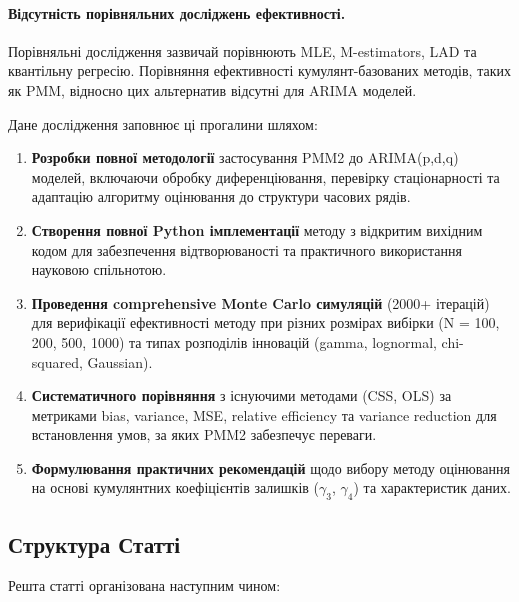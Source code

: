 \documentclass[12pt,a4paper]{article}
\begin{document}
\paragraph{Відсутність порівняльних досліджень ефективності.} Порівняльні дослідження зазвичай порівнюють MLE, M-estimators, LAD та квантільну регресію. Порівняння ефективності кумулянт-базованих методів, таких як PMM, відносно цих альтернатив відсутні для ARIMA моделей.

Дане дослідження заповнює ці прогалини шляхом:

\begin{enumerate}
    \item \textbf{Розробки повної методології} застосування PMM2 до ARIMA(p,d,q) моделей, включаючи обробку диференціювання, перевірку стаціонарності та адаптацію алгоритму оцінювання до структури часових рядів.

    \item \textbf{Створення повної Python імплементації} методу з відкритим вихідним кодом для забезпечення відтворюваності та практичного використання науковою спільнотою.

    \item \textbf{Проведення comprehensive Monte Carlo симуляцій} (2000+ ітерацій) для верифікації ефективності методу при різних розмірах вибірки (N = 100, 200, 500, 1000) та типах розподілів інновацій (gamma, lognormal, chi-squared, Gaussian).

    \item \textbf{Систематичного порівняння} з існуючими методами (CSS, OLS) за метриками bias, variance, MSE, relative efficiency та variance reduction для встановлення умов, за яких PMM2 забезпечує переваги.

    \item \textbf{Формулювання практичних рекомендацій} щодо вибору методу оцінювання на основі кумулянтних коефіцієнтів залишків ($\gamma_3$, $\gamma_4$) та характеристик даних.
\end{enumerate}

\subsection{Структура Статті}
\label{subsec:structure}

Решта статті організована наступним чином:
\end{document}
